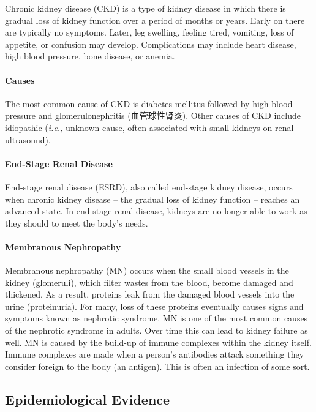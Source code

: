 \documentclass{article}
\begin{document}
Chronic kidney disease (CKD) is a type of kidney disease in which there is gradual loss of kidney function over a period of months or years. Early on there are typically no symptoms. Later, leg swelling, feeling tired, vomiting, loss of appetite, or confusion may develop. Complications may include heart disease, high blood pressure, bone disease, or anemia.

\paragraph{Causes} The most common cause of CKD is diabetes mellitus followed by high blood pressure and glomerulonephritis (血管球性肾炎). Other causes of CKD include idiopathic (\textit{i.e.,} unknown cause, often associated with small kidneys on renal ultrasound). 

\paragraph{End-Stage Renal Disease} End-stage renal disease (ESRD), also called end-stage kidney disease, occurs when chronic kidney disease -- the gradual loss of kidney function -- reaches an advanced state. In end-stage renal disease, kidneys are no longer able to work as they should to meet the body's needs.

\paragraph{Membranous Nephropathy} Membranous nephropathy (MN) occurs when the small blood vessels in the kidney (glomeruli), which filter wastes from the blood, become damaged and thickened. As a result, proteins leak from the damaged blood vessels into the urine (proteinuria). For many, loss of these proteins eventually causes signs and symptoms known as nephrotic syndrome. MN is one of the most common causes of the nephrotic syndrome in adults. Over time this can lead to kidney failure as well. MN is caused by the build-up of immune complexes within the kidney itself. Immune complexes are made when a person's antibodies attack something they consider foreign to the body (an antigen). This is often an infection of some sort. 

\subsection{Epidemiological Evidence}
\end{document}
